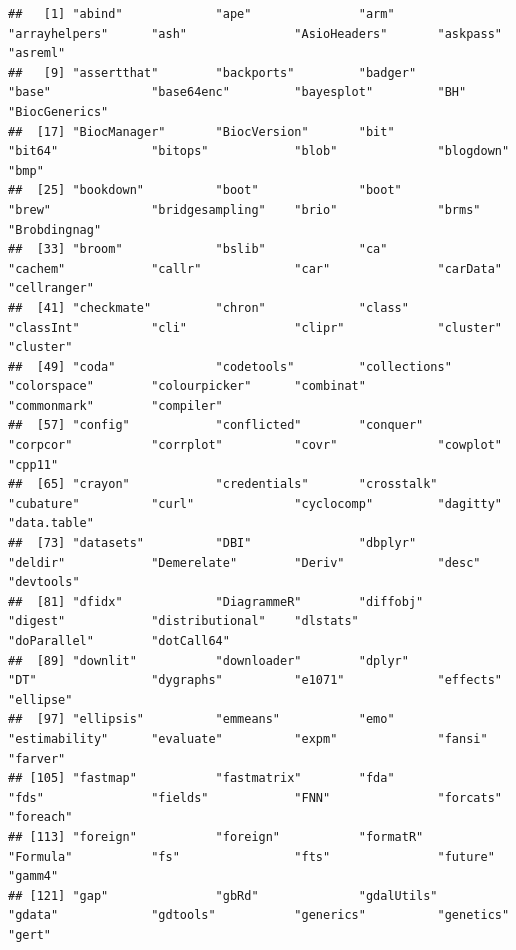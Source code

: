 \documentclass[
  12pt,
]{book}
\begin{document}
\begin{verbatim}
##   [1] "abind"             "ape"               "arm"               "arrayhelpers"      "ash"               "AsioHeaders"       "askpass"           "asreml"           
##   [9] "assertthat"        "backports"         "badger"            "base"              "base64enc"         "bayesplot"         "BH"                "BiocGenerics"     
##  [17] "BiocManager"       "BiocVersion"       "bit"               "bit64"             "bitops"            "blob"              "blogdown"          "bmp"              
##  [25] "bookdown"          "boot"              "boot"              "brew"              "bridgesampling"    "brio"              "brms"              "Brobdingnag"      
##  [33] "broom"             "bslib"             "ca"                "cachem"            "callr"             "car"               "carData"           "cellranger"       
##  [41] "checkmate"         "chron"             "class"             "classInt"          "cli"               "clipr"             "cluster"           "cluster"          
##  [49] "coda"              "codetools"         "collections"       "colorspace"        "colourpicker"      "combinat"          "commonmark"        "compiler"         
##  [57] "config"            "conflicted"        "conquer"           "corpcor"           "corrplot"          "covr"              "cowplot"           "cpp11"            
##  [65] "crayon"            "credentials"       "crosstalk"         "cubature"          "curl"              "cyclocomp"         "dagitty"           "data.table"       
##  [73] "datasets"          "DBI"               "dbplyr"            "deldir"            "Demerelate"        "Deriv"             "desc"              "devtools"         
##  [81] "dfidx"             "DiagrammeR"        "diffobj"           "digest"            "distributional"    "dlstats"           "doParallel"        "dotCall64"        
##  [89] "downlit"           "downloader"        "dplyr"             "DT"                "dygraphs"          "e1071"             "effects"           "ellipse"          
##  [97] "ellipsis"          "emmeans"           "emo"               "estimability"      "evaluate"          "expm"              "fansi"             "farver"           
## [105] "fastmap"           "fastmatrix"        "fda"               "fds"               "fields"            "FNN"               "forcats"           "foreach"          
## [113] "foreign"           "foreign"           "formatR"           "Formula"           "fs"                "fts"               "future"            "gamm4"            
## [121] "gap"               "gbRd"              "gdalUtils"         "gdata"             "gdtools"           "generics"          "genetics"          "gert"             

\end{verbatim}
\end{document}

